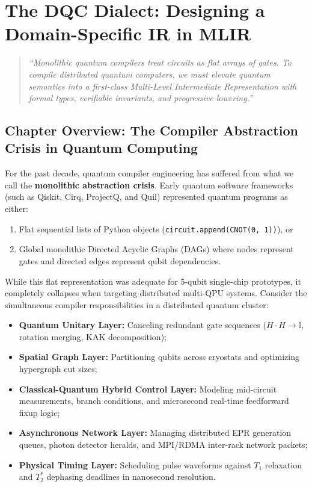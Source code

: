 \chapter{The DQC Dialect: Designing a Domain-Specific IR in MLIR}
\label{ch:mlir_compiler_architecture}

\begin{quote}
\textit{``Monolithic quantum compilers treat circuits as flat arrays of gates. To compile distributed quantum computers, we must elevate quantum semantics into a first-class Multi-Level Intermediate Representation with formal types, verifiable invariants, and progressive lowering.''}
\end{quote}

\section*{Chapter Overview: The Compiler Abstraction Crisis in Quantum Computing}

For the past decade, quantum compiler engineering has suffered from what we call the \textbf{monolithic abstraction crisis}. Early quantum software frameworks (such as Qiskit, Cirq, ProjectQ, and Quil) represented quantum programs as either:
\begin{enumerate}
    \item Flat sequential lists of Python objects (\texttt{circuit.append(CNOT(0, 1))}), or
    \item Global monolithic Directed Acyclic Graphs (DAGs) where nodes represent gates and directed edges represent qubit dependencies.
\end{enumerate}

While this flat representation was adequate for 5-qubit single-chip prototypes, it completely collapses when targeting distributed multi-QPU systems. Consider the simultaneous compiler responsibilities in a distributed quantum cluster:
\begin{itemize}
    \item \textbf{Quantum Unitary Layer:} Canceling redundant gate sequences ($H \cdot H \to \mathbb{I}$, rotation merging, KAK decomposition);
    \item \textbf{Spatial Graph Layer:} Partitioning qubits across cryostats and optimizing hypergraph cut sizes;
    \item \textbf{Classical-Quantum Hybrid Control Layer:} Modeling mid-circuit measurements, branch conditions, and microsecond real-time feedforward fixup logic;
    \item \textbf{Asynchronous Network Layer:} Managing distributed EPR generation queues, photon detector heralds, and MPI/RDMA inter-rack network packets;
    \item \textbf{Physical Timing Layer:} Scheduling pulse waveforms against $T_1$ relaxation and $T_2^*$ dephasing deadlines in nanosecond resolution.
\end{itemize}


